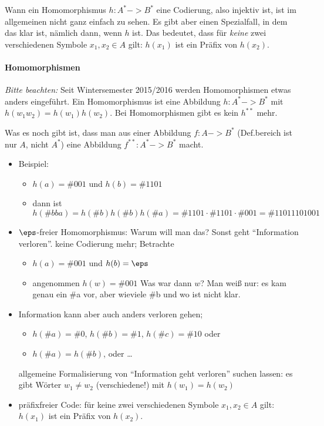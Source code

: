 Wann ein Homomorphismus $h:A^*->B^*$ eine Codierung, also injektiv
ist, ist im allgemeinen nicht ganz einfach zu sehen.
% 
Es gibt aber einen Spezialfall, in dem das klar ist, nämlich
dann, wenn $h$  ist. Das bedeutet, dass für
\emph{keine} zwei verschiedenen Symbole $x_1,x_2\in A$ gilt: $h(x_1)$
ist ein Präfix von $h(x_2)$.
%
\begin{tutorium}
  \paragraph{Homomorphismen}

  \emph{Bitte beachten:} Seit Wintersemester 2015/2016 werden
  Homomorphismen etwas anders eingeführt. Ein Homomorphismus ist eine
  Abbildung $h:A^* -> B^*$ mit $h(w_1w_2)=h(w_1) h(w_2)$. Bei
  Homomorphismen gibt es kein $h^{**}$ mehr.

  Was es noch gibt ist, dass man aus einer Abbildung $f:A->B^*$
  (Def.bereich ist nur $A$, nicht $A^*$) eine Abbildung
  $f^{**}:A^*-> B^*$ macht.

  \begin{itemize}
  \item Beispiel:
    \begin{itemize}
    \item $h(a) = \#{001}$ und $h(b) = \#{1101}$
    \item dann ist $h(\#{bba}) = h(\#b)h(\#b)h(\#a) = \#{1101} \cdot
      \#{1101} \cdot \#{001} = \#{11011101001}$
    \end{itemize}
  \item $\eps$-freier Homomorphismus: Warum will man das? Sonst geht
    "`Information verloren"'.  keine Codierung mehr; Betrachte
    \begin{itemize}
    \item $h(a) = \#{001}$ und $h(b) = \eps$
    \item angenommen $h(w) = \#{001}$ Was war dann $w$? Man weiß nur:
      es kam genau ein \#a vor, aber wieviele \#b und wo ist nicht
      klar.
    \end{itemize}
  \item
    Information kann aber auch anders verloren gehen; 
    \begin{itemize}
    \item \zB $h(\#a)=\#0$, $h(\#b)=\#1$, $h(\#c)=\#{10}$ oder
    \item $h(\#a)=h(\#b)$, oder \dots
    \end{itemize}
    allgemeine Formalisierung von "`Information geht verloren"' suchen
    lassen: es gibt Wörter $w_1\not= w_2$ (verschiedene!) mit
    $h(w_1)=h(w_2)$
\item präfixfreier Code: für keine zwei verschiedenen Symbole $x_1,
    x_2\in A$ gilt: $h(x_1)$ ist ein Präfix von $h(x_2)$.


\end{itemize}
\end{tutorium}
